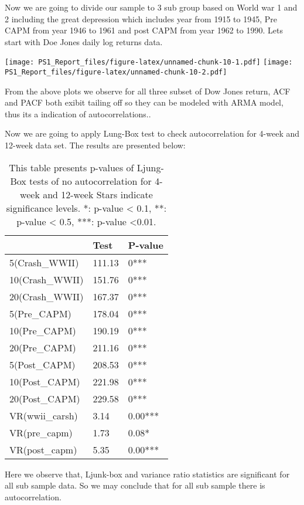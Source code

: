\documentclass[
]{article}
\begin{document}
Now we are going to divide our sample to 3 sub group based on World war
1 and 2 including the great depression which includes year from 1915 to
1945, Pre CAPM from year 1946 to 1961 and post CAPM from year 1962 to
1990. Lets start with Doe Jones daily log returns data.

\texttt{[image: PS1\_Report\_files/figure-latex/unnamed-chunk-10-1.pdf]}
\texttt{[image: PS1\_Report\_files/figure-latex/unnamed-chunk-10-2.pdf]}

From the above plots we observe for all three subset of Dow Jones
return, ACF and PACF both exibit tailing off so they can be modeled with
ARMA model, thus its a indication of autocorrelations..

Now we are going to apply Lung-Box test to check autocorrelation for
4-week and 12-week data set. The results are presented below:

\begin{table}

\caption{\label{tab:unnamed-chunk-11}This table presents p-values of Ljung-Box tests of no autocorrelation for 4-week and 12-week Stars indicate significance levels. *: p-value < 0.1, **: p-value < 0.5, ***: p-value <0.01.}
\centering
\begin{tabular}[t]{l|l|l}
\hline
  & Test & P-value\\
\hline
5(Crash\_WWII) & 111.13 & 0***\\
\hline
10(Crash\_WWII) & 151.76 & 0***\\
\hline
20(Crash\_WWII) & 167.37 & 0***\\
\hline
5(Pre\_CAPM) & 178.04 & 0***\\
\hline
10(Pre\_CAPM) & 190.19 & 0***\\
\hline
20(Pre\_CAPM) & 211.16 & 0***\\
\hline
5(Post\_CAPM) & 208.53 & 0***\\
\hline
10(Post\_CAPM) & 221.98 & 0***\\
\hline
20(Post\_CAPM) & 229.58 & 0***\\
\hline
VR(wwii\_carsh) & 3.14 & 0.00***\\
\hline
VR(pre\_capm) & 1.73 & 0.08*\\
\hline
VR(post\_capm) & 5.35 & 0.00***\\
\hline
\end{tabular}
\end{table}

Here we observe that, Ljunk-box and variance ratio statistics are
significant for all sub sample data. So we may conclude that for all sub
sample there is autocorrelation.
\end{document}
